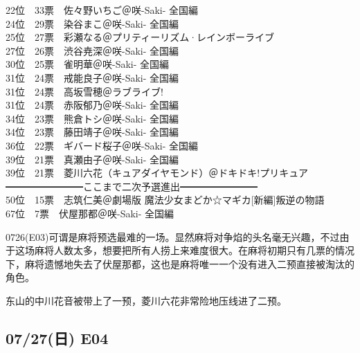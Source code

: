 {    22位　33票　佐々野いちご＠咲-Saki- 全国編                                               \\
    24位　29票　染谷まこ＠咲-Saki- 全国編                                                   \\
    25位　27票　彩瀬なる＠プリティーリズム·レインボーライブ                                \\
    27位　26票　渋谷尭深＠咲-Saki- 全国編                                                   \\
    30位　25票　雀明華＠咲-Saki- 全国編                                                     \\
    31位　24票　戒能良子＠咲-Saki- 全国編                                                   \\
    31位　24票　高坂雪穂＠ラブライブ!                                                       \\
    31位　24票　赤阪郁乃＠咲-Saki- 全国編                                                   \\
    34位　23票　熊倉トシ＠咲-Saki- 全国編                                                   \\
    34位　23票　藤田靖子＠咲-Saki- 全国編                                                   \\
    36位　22票　ギバード桜子＠咲-Saki- 全国編                                               \\
    39位　21票　真瀬由子＠咲-Saki- 全国編                                                   \\
    39位　21票　菱川六花（キュアダイヤモンド）＠ドキドキ!プリキュア                         \\
    ━━━━━━━━ここまで二次予選進出━━━━━━━━                                    \\
    50位　15票　志筑仁美＠劇場版 魔法少女まどか☆マギカ[新編]叛逆の物語                     \\
    67位　7票　伏屋那都＠咲-Saki- 全国編
}

0726(E03)可谓是麻将预选最难的一场。显然麻将对争焰的头名毫无兴趣，不过由于这场麻将人数太多，想要把所有人捞上来难度很大。在麻将初期只有几票的情况下，麻将遗憾地失去了伏屋那都，这也是麻将唯一一个没有进入二预直接被淘汰的角色。

东山的中川花音被带上了一预，菱川六花非常险地压线进了二预。

\subsection{07/27(日) E04}

